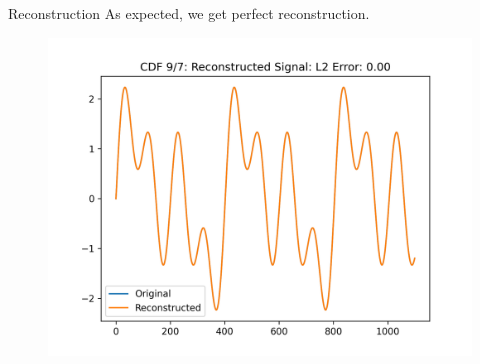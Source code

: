 \documentclass[9pt]{beamer}
\begin{document}
\begin{frame}{Reconstruction}
	As expected, we get perfect reconstruction.
	\begin{figure}[h]
		\centering
		\includegraphics[scale=0.5]{./plots/cdf97_idwt.png}
	\end{figure}
	
\end{frame}
\end{document}
